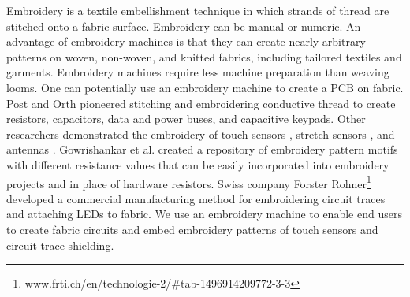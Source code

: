 Embroidery is a textile  embellishment technique in which strands of thread are stitched onto a fabric surface. Embroidery can be manual or numeric. An advantage of embroidery machines is that they can create nearly arbitrary patterns on woven, non-woven, and knitted fabrics, including tailored textiles and garments. Embroidery machines require less machine preparation than weaving looms.
One can potentially use an embroidery machine to create a PCB on fabric. 
Post and Orth \cite{5387040} pioneered stitching and embroidering conductive thread to create resistors, capacitors, data and power buses, and capacitive keypads. 
Other researchers demonstrated the embroidery of touch sensors \cite{hamdan2016grabbing,roh2014textile,zeagler2012textile}, stretch sensors \cite{vogl2017stretcheband}, and antennas \cite{brechet2017cost}. Gowrishankar et al. \cite{Gowrishankar:2013:PRE:2493988.2494341} created a repository of embroidery pattern motifs
with different resistance values that can be easily incorporated into embroidery projects and in place of hardware resistors. Swiss company Forster Rohner\footnote{www.frti.ch/en/technologie-2/#tab-1496914209772-3-3}
developed a commercial manufacturing method for embroidering circuit traces and attaching LEDs to fabric. 
We use an embroidery machine to enable end users to create fabric circuits and embed embroidery patterns of touch sensors and circuit trace shielding.






